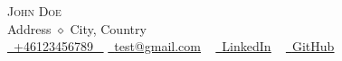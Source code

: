 \documentclass{resume} %
\makeatletter
\newcommand{\setBoldness}[1]{\def\fake@bold{#1}}
\makeatother
\begin{document}
\setBoldness{0.5}
\vspace{-35pt}

\begin{center}
    {\Huge \scshape John Doe} \\ \vspace{1pt}
    Address $\diamond$ City, Country
    \\ \vspace{1pt}
    \small \href{tel:+46123456789}{ \raisebox{-0.1\height}\faPhone\ 
    \underline{+46123456789} ~} \href{mailto:test@gmail.com}{\raisebox{-0.2\height}\faEnvelope\  \underline{test@gmail.com}} ~  
    \href{https://www.linkedin.com/in/your_acc/}{\raisebox{-0.2\height}\faLinkedinSquare\ \underline{LinkedIn}}  ~
    \href{https://github.com/your_acc}{\raisebox{-0.2\height}\faGithub\ \underline{GitHub}}
    \vspace{-8pt}
\end{center}

\end{document}

